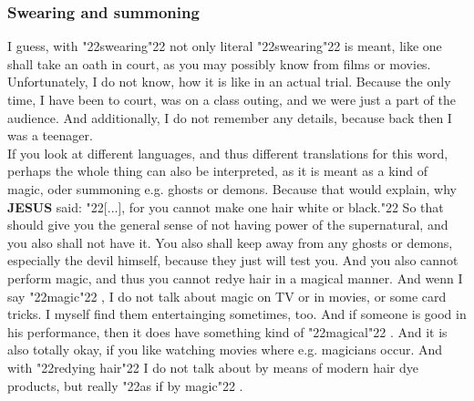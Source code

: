 \documentclass[12pt,a5paper]{article}
\newcommand{\Jesus}[0]{\textbf{JESUS}}
\newcommand{\q}[1]{\char"22{#1}\char"22 }
\begin{document}
	\subsubsection{Swearing and summoning}
		I guess,
		with \q{swearing} not only literal \q{swearing} is meant,
		like one shall take an oath in court,
		as you may possibly know from films or movies.
		Unfortunately,
		I do not know,
		how it is like in an actual trial.
		Because the only time,
		I have been to court,
		was on a class outing,
		and we were just a part of the audience.
		And additionally,
		I do not remember any details,
		because back then I was a teenager.
		\\
		If you look at different languages,
		and thus different translations for this word,
		perhaps the whole thing can also be interpreted,
		as it is meant as a kind of magic,
		oder summoning e.g. ghosts or demons.
		Because that would explain,
		why {\Jesus} said:
		\q{[...],
		for you cannot make one hair white or black.}
		So that should give you the general sense of not having power of the supernatural,
		and you also shall not have it.
		You also shall keep away from any ghosts or demons,
		especially the devil himself,
		because they just will test you.
		And you also cannot perform magic,
		and thus you cannot redye hair in a magical manner.
		And wenn I say \q{magic},
		I do not talk about magic on TV or in movies,
		or some card tricks.
		I myself find them entertainging sometimes, too.
		And if someone is good in his performance,
		then it does have something kind of \q{magical}.
		And it is also totally okay,
		if you like watching movies where e.g. magicians occur.
		And with \q{redying hair} I do not talk about by means of modern hair dye products,
		but really \q{as if by magic}.
\end{document}
